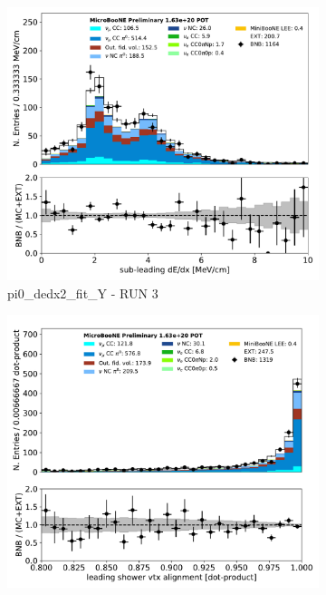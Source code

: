 \documentclass[a4paper]{article}
\begin{document}
\begin{figure}[H] 
\begin{center}
    \begin{subfigure}[b]{0.3\textwidth}
    \centering
    \includegraphics[width=1.00\textwidth]{pi0/pi0_dedx2_fit_Y_01152020_inputs_RUN3.pdf}
    \caption{\label{fig:pi0:inputs:dedx2:RUN3} pi0\_dedx2\_fit\_Y - RUN 3 }
    \end{subfigure}
    \begin{subfigure}[b]{0.3\textwidth}
    \centering
    \includegraphics[width=1.00\textwidth]{pi0/pi0_dot1_01152020_inputs_RUN3.pdf}

\end{subfigure}
\end{center}
\end{figure}
\end{document}
